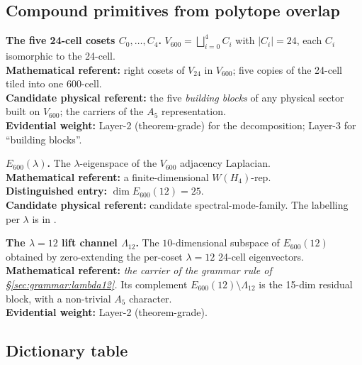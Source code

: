 \documentclass[11pt,a4paper]{article}
\newcommand{\Vsix}{V_{600}}
\newcommand{\Vtf}{V_{24}}
\newcommand{\Lambt}{\Lambda_{12}}
\newcommand{\Esix}{E_{600}}
\begin{document}
\subsection{Compound primitives from polytope overlap}

\begin{dictionarybox}
\textbf{The five 24-cell cosets $C_0, \ldots, C_4$.}
$\Vsix = \bigsqcup_{i=0}^4 C_i$ with $|C_i| = 24$, each $C_i$
isomorphic to the 24-cell.
\\[0.3em]
\textbf{Mathematical referent:} right cosets of $\Vtf$ in $\Vsix$;
five copies of the 24-cell tiled into one 600-cell.\\
\textbf{Candidate physical referent:} the five \emph{building
blocks} of any physical sector built on $\Vsix$; the carriers of
the $A_5$ representation.\\
\textbf{Evidential weight:} Layer-2 (theorem-grade) for the
decomposition; Layer-3 for ``building blocks''.
\end{dictionarybox}

\begin{dictionarybox}
\textbf{$\Esix(\lambda)$.} The $\lambda$-eigenspace of the
$\Vsix$ adjacency Laplacian.
\\[0.3em]
\textbf{Mathematical referent:} a finite-dimensional $W(H_4)$-rep.\\
\textbf{Distinguished entry:} $\dim \Esix(12) = 25$.\\
\textbf{Candidate physical referent:} candidate
spectral-mode-family. The labelling per $\lambda$ is in
\cite{icosianTriad}.
\end{dictionarybox}

\begin{dictionarybox}
\textbf{The $\lambda = 12$ lift channel $\Lambt$.} The
$10$-dimensional subspace of $\Esix(12)$ obtained by zero-extending
the per-coset $\lambda = 12$ 24-cell eigenvectors.
\\[0.3em]
\textbf{Mathematical referent:} \emph{the carrier of the grammar
rule of \S\ref{sec:grammar:lambda12}.} Its complement
$\Esix(12) \setminus \Lambt$ is the 15-dim residual block, with a
non-trivial $A_5$ character.\\
\textbf{Evidential weight:} Layer-2 (theorem-grade).
\end{dictionarybox}

\subsection{Dictionary table}
\end{document}
